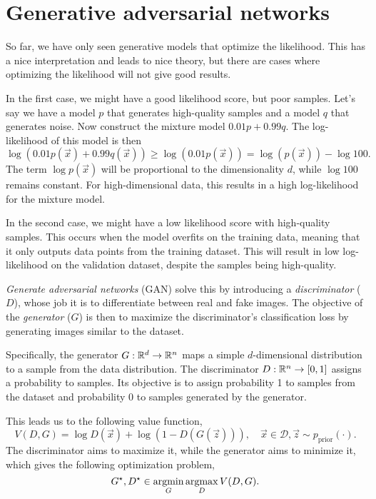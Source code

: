 \section{Generative adversarial networks}

So far, we have only seen generative models that optimize the likelihood. This has a nice
interpretation and leads to nice theory, but there are cases where optimizing the likelihood will
not give good results.

In the first case, we might have a good likelihood score, but poor samples. Let's say we have a
model $p$ that generates high-quality samples and a model $q$ that generates noise. Now construct
the mixture model $0.01 p + 0.99 q$. The log-likelihood of this model is then \[
    \log(0.01 p(\vec{x}) + 0.99 q(\vec{x})) \geq \log (0.01 p(\vec{x})) = \log(p(\vec{x})) - \log 100.
\]
The term $\log p(\vec{x})$ will be proportional to the dimensionality $d$, while $\log 100$ remains
constant. For high-dimensional data, this results in a high log-likelihood for the mixture model.

In the second case, we might have a low likelihood score with high-quality samples. This occurs
when the model overfits on the training data, meaning that it only outputs data points from the
training dataset. This will result in low log-likelihood on the validation dataset, despite the
samples being high-quality.

\textit{Generate adversarial networks} (GAN) solve this by introducing a \textit{discriminator} ($D$),
whose job it is to differentiate between real and fake images. The objective of the
\textit{generator} ($G$) is then to maximize the discriminator's classification loss by generating
images similar to the dataset.

Specifically, the generator $G: \mathbb{R}^d \to \mathbb{R}^n$ maps a simple $d$-dimensional distribution to a
sample from the data distribution. The discriminator $D: \mathbb{R}^n \to [0,1]$ assigns a probability to
samples. Its objective is to assign probability 1 to samples from the dataset and probability 0 to
samples generated by the generator.

This leads us to the following value function, \[
    V(D,G) = \log D(\vec{x}) + \log (1 - D(G(\vec{z}))), \quad \vec{x} \in \mathcal{D}, \vec{z} \sim p_{\mathrm{prior}}(\cdot).
\]
The discriminator aims to maximize it, while the generator aims to minimize it, which gives the
following optimization problem, \[
    G^\star, D^\star \in \operatorname*{argmin}_G \operatorname*{argmax}_D V(D,G).
\]

